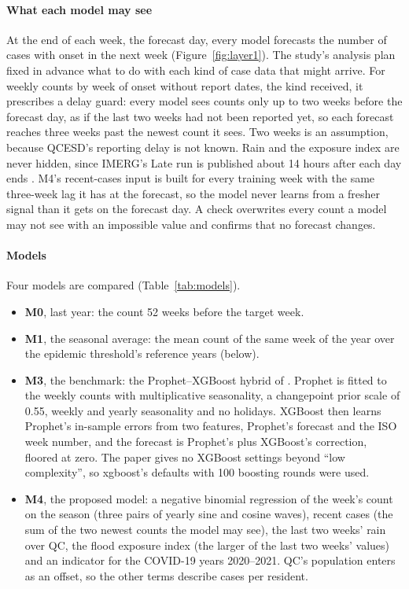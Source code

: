 \paragraph{What each model may see}
At the end of each week, the forecast day, every model forecasts the number of cases with onset in
the next week (Figure~\ref{fig:layer1}). The study's analysis plan fixed in advance what to do with each kind of case data
that might arrive. For weekly counts by week of onset without report dates, the kind received, it
prescribes a delay guard: every model sees counts only up to two weeks before the forecast day, as if the last
two weeks had not been reported yet, so each forecast reaches three weeks past the newest count it
sees. Two weeks is an assumption, because QCESD's reporting delay is not known. Rain and the
exposure index are never hidden, since IMERG's Late run is published about 14 hours after each
day ends \parencite{huffman2024}. M4's recent-cases input is built
for every training week with the same three-week lag it has at the forecast, so the model never
learns from a fresher signal than it gets on the forecast day. A check overwrites every count a model may not see
with an impossible value and confirms that no forecast changes.

\paragraph{Models}
Four models are compared (Table~\ref{tab:models}).
\begin{itemize}
  \item \textbf{M0}, last year: the count 52 weeks before the target week.
  \item \textbf{M1}, the seasonal average: the mean count of the same week of the year over the
    epidemic threshold's reference years (below).
  \item \textbf{M3}, the benchmark: the Prophet--XGBoost hybrid of \textcite{latigay2026}. Prophet
    \parencite{taylor2018} is fitted to the weekly counts with multiplicative seasonality, a
    changepoint prior scale of 0.55, weekly and yearly seasonality and no holidays. XGBoost
    \parencite{chen2016} then learns Prophet's in-sample errors from two features, Prophet's
    forecast and the ISO week number, and the forecast is Prophet's plus XGBoost's correction,
    floored at zero. The paper gives no XGBoost settings beyond ``low complexity'', so xgboost's
    defaults with 100 boosting rounds were used.
  \item \textbf{M4}, the proposed model: a negative binomial regression of the week's count on
    the season
    (three pairs of yearly sine and cosine waves), recent cases (the sum of the two newest counts
    the model may see), the last two weeks' rain over QC, the flood exposure index (the larger of
    the last two weeks' values) and an indicator for the COVID-19 years 2020--2021. QC's
    population enters as an offset, so the other terms describe cases per resident.
\end{itemize}

